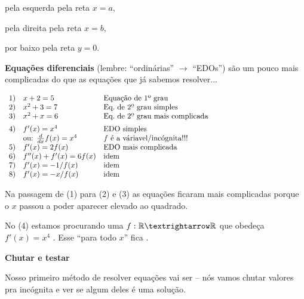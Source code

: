 \documentclass[oneside,12pt]{article}
\begin{document}
pela esquerda pela reta $x=a$,

pela direita pela reta $x=b$,

por baixo pela reta $y=0$.

\newpage


{\bf Equações diferenciais} (lembre: ``ordinárias'' $→$ ``EDOs'') são
um pouco mais complicadas do que as equações que já sabemos
resolver...

\def\te{\text}

\msk

$\scalebox{0.90}{$
\begin{array}{rll}
 1) & x+2   = 5                   & \te{Equação de 1º grau} \\
 2) & x^2+3 = 7                   & \te{Eq.\ de 2º grau simples} \\
 3) & x^2+x = 6                   & \te{Eq.\ de 2º grau mais complicada} \\[5pt]
 4) & f'(x) = x^4                 & \te{EDO simples} \\
    & \text{ou: } \ddx f(x) = x^4 & \te{$f$ é a váriavel/incógnita!!!} \\
 5) & f'(x) = 2f(x)               & \te{EDO mais complicada} \\
 6) & f''(x) + f'(x) = 6f(x)      & \te{idem} \\
 7) & f'(x) = -1/f(x)             & \te{idem} \\
 8) & f'(x) = -x/f(x)             & \te{idem} \\
 \end{array}
 $}
$

\msk

Na passagem de (1) para (2) e (3) as equações ficaram mais complicadas
porque o $x$ passou a poder aparecer elevado ao quadrado.

No (4) estamos procurando uma  $f:\R→\R$ que obedeça
$f'(x) = x^4$ . Esse ``para todo $x$'' fica
.

\newpage


{\bf Chutar e testar}

Nosso primeiro método de resolver equações vai ser  -- nós vamos chutar valores pra incógnita e ver se algum
deles é uma solução.
\end{document}
